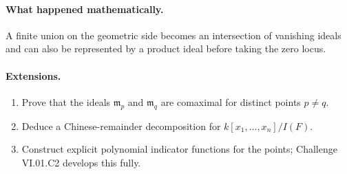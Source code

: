 \paragraph{What happened mathematically.}
A finite union on the geometric side becomes an intersection of vanishing ideals and can
also be represented by a product ideal before taking the zero locus.

\paragraph{Extensions.}
\begin{enumerate}
\item Prove that the ideals \(\mathfrak m_p\) and \(\mathfrak m_q\) are comaximal for
      distinct points \(p\neq q\).
\item Deduce a Chinese-remainder decomposition for \(k[x_1,\dots,x_n]/I(F)\).
\item Construct explicit polynomial indicator functions for the points; Challenge VI.01.C2
      develops this fully.
\end{enumerate}
\fi
